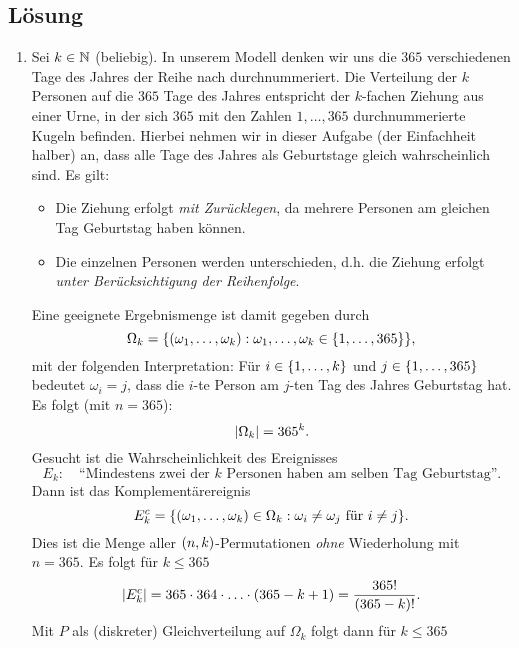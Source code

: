 \documentclass{exercise}
\begin{document}
    \subsection*{Lösung}
    \begin{enumerate}
        \item Sei \(k \in \N\) (beliebig).
        In unserem Modell denken wir uns die \(365\) verschiedenen Tage des Jahres der Reihe nach durchnummeriert.
        Die Verteilung der \(k\) Personen auf die \(365\) Tage des Jahres entspricht der \(k\)-fachen Ziehung aus einer Urne, in der sich \(365\) mit den Zahlen \(1, \ldots, 365\) durchnummerierte Kugeln befinden.
        Hierbei nehmen wir in dieser Aufgabe (der Einfachheit halber) an, dass alle Tage des Jahres als Geburtstage gleich wahrscheinlich sind.
        Es gilt:
        \begin{itemize}
            \item Die Ziehung erfolgt \emph{mit Zurücklegen}, da mehrere Personen am gleichen Tag Geburtstag haben können.
            \item Die einzelnen Personen werden unterschieden, d.h. die Ziehung erfolgt \emph{unter Berücksichtigung der Reihenfolge}.
        \end{itemize}
        Eine geeignete Ergebnismenge ist damit gegeben durch
        \[
            \Omega_k = \braces*{\parentheses*{\omega_1, \ldots, \omega_k} : \omega_1, \ldots, \omega_k \in \braces*{1, \ldots, 365}},
        \]
        mit der folgenden Interpretation: Für \(i \in \braces*{1, \ldots, k}\) und \(j \in \braces*{1, \ldots, 365}\) bedeutet \(\omega_i = j\), dass die \(i\)-te Person am \(j\)-ten Tag des Jahres Geburtstag hat.
        Es folgt (mit \(n = 365\)):
        \[
            \absolute*{\Omega_k} = 365^k.
        \]
        Gesucht ist die Wahrscheinlichkeit des Ereignisses
        \[
            E_k: \quad \text{``Mindestens zwei der }k\text{ Personen haben am selben Tag Geburtstag''}.
        \]
        Dann ist das Komplementärereignis
        \[
            E_k^c = \braces*{\parentheses*{\omega_1, \ldots, \omega_k} \in \Omega_k : \omega_i \ne \omega_j\text{ für }i \ne j}.
        \]
        Dies ist die Menge aller \(\parentheses*{n, k}\)-Permutationen \emph{ohne} Wiederholung mit \(n = 365\).
        Es folgt für \(k \le 365\)
        \[
            \absolute*{E_k^c} = 365 \cdot 364 \cdot \ldots \cdot \parentheses*{365 - k + 1} = \frac{365!}{\parentheses*{365 - k}!}.
        \]
        Mit \(P\) als (diskreter) Gleichverteilung auf \(\Omega_k\) folgt dann für \(k \le 365\)
        \begin{equation}\label{eq:1}

\end{equation}
\end{enumerate}
\end{document}
